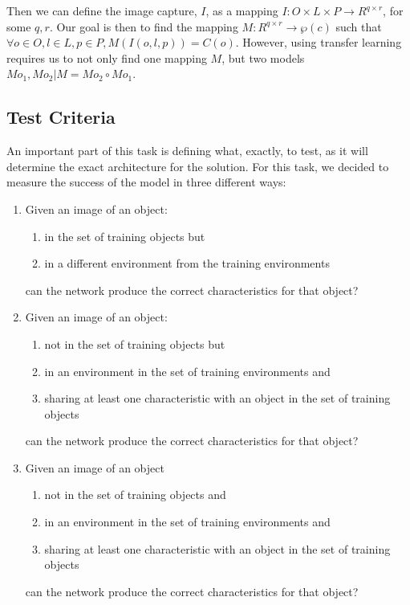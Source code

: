 \documentclass{article}
\begin{document}
Then we can define the image capture, $ I $, as a mapping $ I: O \times L \times P \rightarrow R^{q \times r} $, for some $ q, r $. Our goal is then to find the mapping $ M: R^{q \times r} \rightarrow \wp(c) $ such that $ \forall o \in O, l \in L, p \in P, M(I(o, l, p)) = C(o) $. However, using transfer learning requires us to not only find one mapping $ M $, but two models $ Mo_1, Mo_2 | M = Mo_2 \circ Mo_1  $.

\subsection{Test Criteria}

An important part of this task is defining what, exactly, to test, as it will determine the exact architecture for the solution. For this task, we decided to measure the success of the model in three different ways:

\begin{enumerate}
	\item Given an image of an object:
	\begin{enumerate}
		\item in the set of training objects but 
		\item in a different environment from the training environments
	\end{enumerate}
	can the network produce the correct characteristics for that object?
	\item Given an image of an object:
	\begin{enumerate}
		\item not in the set of training objects but
		\item in an environment in the set of training environments and
		\item sharing at least one characteristic with an object in the set of training objects
	\end{enumerate}
	can the network produce the correct characteristics for that object?
	\item Given an image of an object
	\begin{enumerate}
		\item not in the set of training objects and
		\item in an environment in the set of training environments and
		\item sharing at least one characteristic with an object in the set of training objects
	\end{enumerate}
	can the network produce the correct characteristics for that object?
\end{enumerate}
\end{document}
